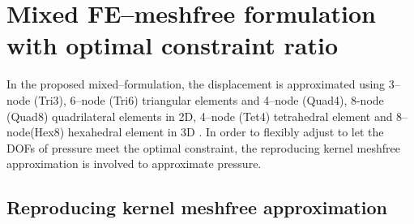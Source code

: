 \section{Mixed FE--meshfree formulation with optimal constraint ratio}

In the proposed mixed--formulation, the displacement is approximated using 3--node (Tri3), 6--node (Tri6) triangular elements and 4--node (Quad4), 8-node (Quad8) quadrilateral elements in 2D, 4--node (Tet4) tetrahedral element and 8--node(Hex8) hexahedral element in 3D \cite{hughes2000}. In order to flexibly adjust to let the DOFs of pressure meet the optimal constraint, the reproducing kernel meshfree approximation is involved to approximate pressure.

\subsection{Reproducing kernel meshfree approximation}

